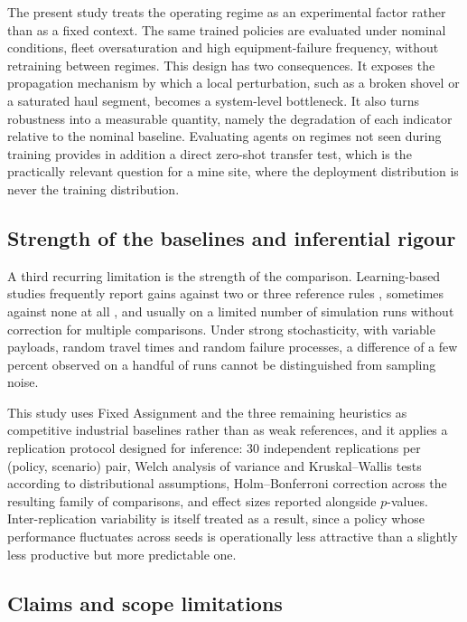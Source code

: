 \documentclass[11pt,a4paper]{article}
\begin{document}
The present study treats the operating regime as an experimental factor rather than as a fixed context. The same trained policies are evaluated under nominal conditions, fleet oversaturation and high equipment-failure frequency, without retraining between regimes. This design has two consequences. It exposes the propagation mechanism by which a local perturbation, such as a broken shovel or a saturated haul segment, becomes a system-level bottleneck. It also turns robustness into a measurable quantity, namely the degradation of each indicator relative to the nominal baseline. Evaluating agents on regimes not seen during training provides in addition a direct zero-shot transfer test, which is the practically relevant question for a mine site, where the deployment distribution is never the training distribution.

\subsection{Strength of the baselines and inferential rigour}

A third recurring limitation is the strength of the comparison. Learning-based studies frequently report gains against two or three reference rules \cite{Zhao2025}, sometimes against none at all \cite{deCarvalho2023}, and usually on a limited number of simulation runs without correction for multiple comparisons. Under strong stochasticity, with variable payloads, random travel times and random failure processes, a difference of a few percent observed on a handful of runs cannot be distinguished from sampling noise.

This study uses Fixed Assignment and the three remaining heuristics as competitive industrial baselines rather than as weak references, and it applies a replication protocol designed for inference: 30 independent replications per (policy, scenario) pair, Welch analysis of variance and Kruskal--Wallis tests according to distributional assumptions, Holm--Bonferroni correction across the resulting family of comparisons, and effect sizes reported alongside $p$-values. Inter-replication variability is itself treated as a result, since a policy whose performance fluctuates across seeds is operationally less attractive than a slightly less productive but more predictable one.

\subsection{Claims and scope limitations}
\end{document}
